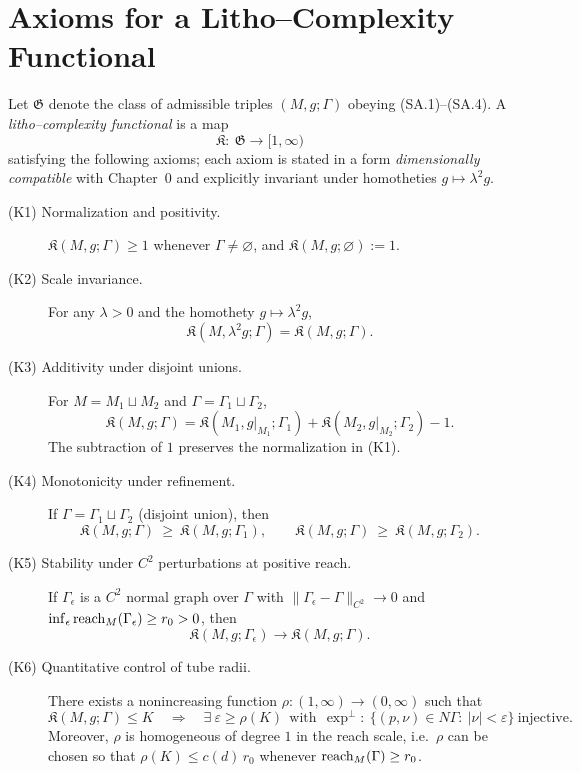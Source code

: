 \bigskip

\section{Axioms for a Litho–Complexity Functional}
\label{sec:axioms}

Let $\mathfrak{G}$ denote the class of admissible triples $(M,g;\Gamma)$ obeying (SA.1)–(SA.4).
A \emph{litho–complexity functional} is a map
\[
\mathfrak{K}:\ \mathfrak{G}\longrightarrow [1,\infty)
\]
satisfying the following axioms; each axiom is stated in a form \emph{dimensionally compatible} with Chapter~0 and explicitly invariant under homotheties $g\mapsto \lambda^2 g$.

\begin{description}
\item[(K1) Normalization and positivity.] $\mathfrak{K}(M,g;\Gamma)\ge 1$ whenever $\Gamma\neq\varnothing$, and $\mathfrak{K}(M,g;\varnothing):=1$.
\smallskip

\item[(K2) Scale invariance.] For any $\lambda>0$ and the homothety $g\mapsto \lambda^2 g$,
\[
\mathfrak{K}(M,\lambda^2 g;\Gamma)=\mathfrak{K}(M,g;\Gamma).
\]
\smallskip

\item[(K3) Additivity under disjoint unions.] For $M=M_1\sqcup M_2$ and $\Gamma=\Gamma_1\sqcup\Gamma_2$,
\[
\mathfrak{K}(M,g;\Gamma)=\mathfrak{K}(M_1,g|_{M_1};\Gamma_1)+\mathfrak{K}(M_2,g|_{M_2};\Gamma_2)-1.
\]
The subtraction of $1$ preserves the normalization in (K1).
\smallskip

\item[(K4) Monotonicity under refinement.] If $\Gamma=\Gamma_1\sqcup\Gamma_2$ (disjoint union), then
\[
\mathfrak{K}(M,g;\Gamma)\ \ge\ \mathfrak{K}(M,g;\Gamma_1),\qquad
\mathfrak{K}(M,g;\Gamma)\ \ge\ \mathfrak{K}(M,g;\Gamma_2).
\]
\smallskip

\item[(K5) Stability under $C^2$ perturbations at positive reach.] If $\Gamma_\epsilon$ is a $C^2$ normal graph over $\Gamma$ with $\|\Gamma_\epsilon-\Gamma\|_{C^2}\to 0$ and $\inf_\epsilon \operatorname{reach}_M(\Gamma_\epsilon)\ge r_0>0$, then
\[
\mathfrak{K}(M,g;\Gamma_\epsilon)\longrightarrow \mathfrak{K}(M,g;\Gamma).
\]
\smallskip

\item[(K6) Quantitative control of tube radii.] There exists a nonincreasing function $\rho:(1,\infty)\to (0,\infty)$ such that
\[
\mathfrak{K}(M,g;\Gamma)\le K\quad\Longrightarrow\quad
\exists\ \varepsilon\ge \rho(K)\ \ \text{with}\ \ \exp^\perp:\ \big\{(p,\nu)\in N\Gamma:\ |\nu|<\varepsilon\big\}\ \text{injective.}
\]
Moreover, $\rho$ is homogeneous of degree $1$ in the reach scale, i.e.\ $\rho$ can be chosen so that
$\rho(K)\le c(d)\,r_0$ whenever $\operatorname{reach}_M(\Gamma)\ge r_0$.
\smallskip


\end{description}
